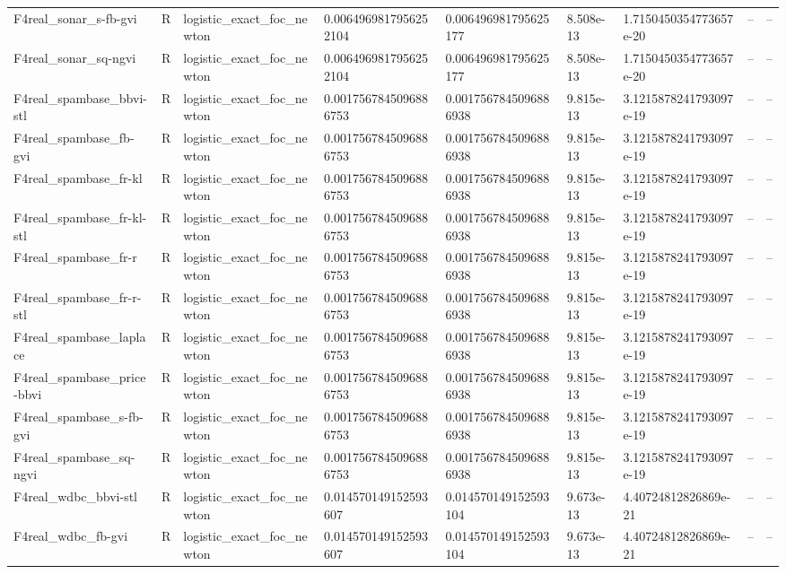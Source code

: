 \begin{tabular}{lllllllll}
F4real\_sonar\_s-fb-gvi & R & logistic\_exact\_foc\_newton & 0.0064969817956252104 & 0.006496981795625177 & 8.508e-13 & 1.7150450354773657e-20 & -- & -- \\
F4real\_sonar\_sq-ngvi & R & logistic\_exact\_foc\_newton & 0.0064969817956252104 & 0.006496981795625177 & 8.508e-13 & 1.7150450354773657e-20 & -- & -- \\
F4real\_spambase\_bbvi-stl & R & logistic\_exact\_foc\_newton & 0.0017567845096886753 & 0.0017567845096886938 & 9.815e-13 & 3.1215878241793097e-19 & -- & -- \\
F4real\_spambase\_fb-gvi & R & logistic\_exact\_foc\_newton & 0.0017567845096886753 & 0.0017567845096886938 & 9.815e-13 & 3.1215878241793097e-19 & -- & -- \\
F4real\_spambase\_fr-kl & R & logistic\_exact\_foc\_newton & 0.0017567845096886753 & 0.0017567845096886938 & 9.815e-13 & 3.1215878241793097e-19 & -- & -- \\
F4real\_spambase\_fr-kl-stl & R & logistic\_exact\_foc\_newton & 0.0017567845096886753 & 0.0017567845096886938 & 9.815e-13 & 3.1215878241793097e-19 & -- & -- \\
F4real\_spambase\_fr-r & R & logistic\_exact\_foc\_newton & 0.0017567845096886753 & 0.0017567845096886938 & 9.815e-13 & 3.1215878241793097e-19 & -- & -- \\
F4real\_spambase\_fr-r-stl & R & logistic\_exact\_foc\_newton & 0.0017567845096886753 & 0.0017567845096886938 & 9.815e-13 & 3.1215878241793097e-19 & -- & -- \\
F4real\_spambase\_laplace & R & logistic\_exact\_foc\_newton & 0.0017567845096886753 & 0.0017567845096886938 & 9.815e-13 & 3.1215878241793097e-19 & -- & -- \\
F4real\_spambase\_price-bbvi & R & logistic\_exact\_foc\_newton & 0.0017567845096886753 & 0.0017567845096886938 & 9.815e-13 & 3.1215878241793097e-19 & -- & -- \\
F4real\_spambase\_s-fb-gvi & R & logistic\_exact\_foc\_newton & 0.0017567845096886753 & 0.0017567845096886938 & 9.815e-13 & 3.1215878241793097e-19 & -- & -- \\
F4real\_spambase\_sq-ngvi & R & logistic\_exact\_foc\_newton & 0.0017567845096886753 & 0.0017567845096886938 & 9.815e-13 & 3.1215878241793097e-19 & -- & -- \\
F4real\_wdbc\_bbvi-stl & R & logistic\_exact\_foc\_newton & 0.014570149152593607 & 0.014570149152593104 & 9.673e-13 & 4.40724812826869e-21 & -- & -- \\
F4real\_wdbc\_fb-gvi & R & logistic\_exact\_foc\_newton & 0.014570149152593607 & 0.014570149152593104 & 9.673e-13 & 4.40724812826869e-21 & -- & -- \\

\end{tabular}
